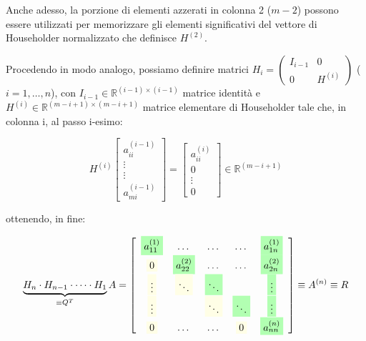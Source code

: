 \begin{osservazione}
    Anche adesso, la porzione di elementi azzerati in colonna 2 ($m-2$) possono essere utilizzati per memorizzare gli elementi significativi del vettore di Householder normalizzato che definisce $H^{(2)}$.
\end{osservazione}

Procedendo in modo analogo, possiamo definire matrici $H_i = \begin{pmatrix} I_{i-1} & 0 \\ 0 & H^{(i)} \end{pmatrix}$ ($i=1, \dots, n$), con $I_{i-1} \in \mathbb{R}^{(i-1) \times (i-1)}$ matrice identità e $H^{(i)} \in \mathbb{R}^{(m-i+1) \times (m-i+1)}$ matrice elementare di Householder tale che, in colonna i, al passo i-esimo:

\[
H^{(i)} 
\begin{bmatrix}
a_{ii}^{(i-1)} \\ \vdots \\ \vdots \\ a_{mi}^{(i-1)}
\end{bmatrix} 
=
\begin{bmatrix}
a_{ii}^{(i)} \\ 0 \\ \vdots \\ 0 
\end{bmatrix} 
\in \mathbb{R}^{(m-i+1)}
\]

ottenendo, in fine:

\[
\underbrace{H_n \cdot H_{n-1} \cdot \dots \cdot H_1}_{\equiv Q^T} A = 
\left[
\begin{array}{ccccc}
\colorbox{green!30}{$a_{11}^{(1)}$} & \dots & \dots & \dots & \colorbox{green!30}{$a_{1n}^{(1)}$} \\
\colorbox{yellow!10}{0} & \colorbox{green!30}{$a_{22}^{(2)}$} & \dots & \dots & \colorbox{green!30}{$a_{2n}^{(2)}$} \\
\colorbox{yellow!10}{$\vdots$} & \colorbox{yellow!10}{$\ddots$} & \colorbox{green!30}{$\ddots$} & & \colorbox{green!30}{$\vdots$} \\
\colorbox{yellow!10}{$\vdots$} & & \colorbox{yellow!10}{$\ddots$} & \colorbox{green!30}{$\ddots$} & \colorbox{green!30}{$\vdots$} \\
\colorbox{yellow!10}{0} & \dots & \dots & \colorbox{yellow!10}{0} & \colorbox{green!30}{$a_{nn}^{(n)}$}
\end{array}
\right]
\equiv A^{(n)} \equiv R
\]

